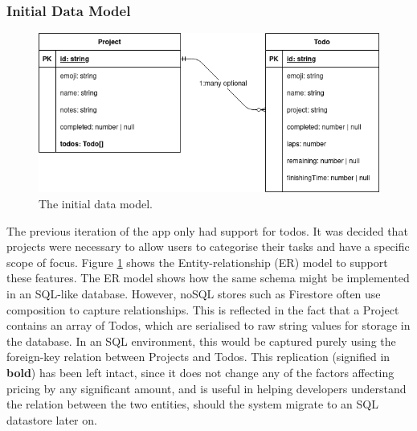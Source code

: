\subsubsection{Initial Data Model}
\begin{figure}[h]
    \begin{center}
        \includegraphics[scale=0.5]{images/initial_data_model.png}
    \end{center}
    \caption{The initial data model.}
    \label{fig:initial_data_model}
\end{figure}

The previous iteration of the app only had support for todos. It was decided that projects were necessary to allow users to categorise their tasks and have a specific scope of focus. Figure \ref{fig:initial_data_model} shows the Entity-relationship (ER) model to support these features. The ER model shows how the same schema might be implemented in an SQL-like database. However, noSQL stores such as Firestore often use composition to capture relationships. This is reflected in the fact that a Project contains an array of Todos, which are serialised to raw string values for storage in the database. In an SQL environment, this would be captured purely using the foreign-key relation between Projects and Todos. This replication (signified in \textbf{bold}) has been left intact, since it does not change any of the factors affecting pricing by any significant amount, and is useful in helping developers understand the relation between the two entities, should the system migrate to an SQL datastore later on.

